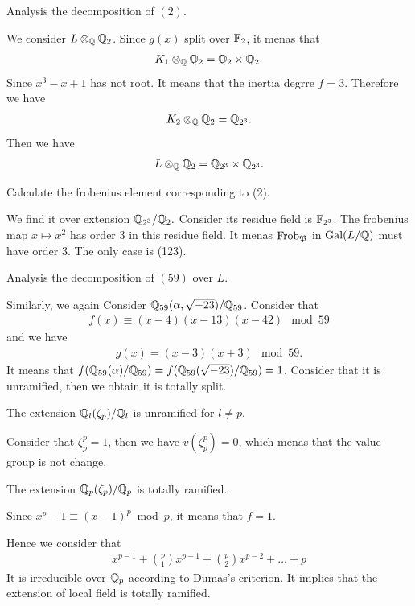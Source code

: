 {\prob Analysis the decomposition of $(2)$.

We consider $L\otimes_{\Q}\Q_{2}$. Since $g(x)$ split over $\F_2$, it menas that 
\begin{align*}
    K_1\otimes_\Q \Q_2 = \Q_2\times \Q_2.
\end{align*}
Since $x^3-x+1$ has not root. It means that the inertia degrre $f=3$. Therefore we have 
\begin{align*}
    K_2 \otimes_\Q \Q_2 = \Q_{2^3}.
\end{align*}
Then we have 
\begin{align*}
    L\otimes_\Q \Q_2 = \Q_{2^3} \times \Q_{2^3}.
\end{align*}

\prob Calculate the frobenius element corresponding to (2).

We find it over extension $\Q_{2^3}/\Q_{2}.$ Consider its residue field is $\F_{2^3}$. 
The frobenius map $x\mapsto x^2$ has order 3 in this residue field. 
It menas $\text{Frob}_\P$ in $\text{Gal}(L/\Q)$ must have order 3. The only case is (123).

\prob Analysis the decomposition of $(59)$ over $L$.

Similarly, we again Consider $\Q_{59}(\alpha,\sqrt{-23})/\Q_{59}$. Consider that 
\begin{align*}
    f(x) \equiv (x-4)(x-13)(x-42)\mod 59  
\end{align*}
and we have 
\begin{align*}
    g(x) = (x-3)(x+3) \mod 59.
\end{align*}
It means that $f(\Q_{59}(\alpha)/\Q_{59})=f(\Q_{59}(\sqrt{-23})/\Q_{59})=1$. 
Consider that it is unramified, then we obtain it is totally split.

\prob The extension $\Q_l(\zeta_p)/\Q_l$ is unramified for $l\neq p$.

Consider that $\zeta_p^{p}=1$, then we have $v(\zeta_p^p)=0$, which menas that the value group is not change.

\prob The extension $\Q_p(\zeta_p)/\Q_p$ is totally ramified.

Since $x^p-1\equiv (x-1)^p\bmod p$, it means that $f=1$.

Hence we consider that 
\begin{align*}
    x^{p-1} + \binom{p}{1}x^{p-1}+\binom{p}{2}x^{p-2}+\dots+p
\end{align*}
It is irreducible over $\Q_p$ according to Dumas's criterion. It implies that the extension of local field is totally ramified.


}
